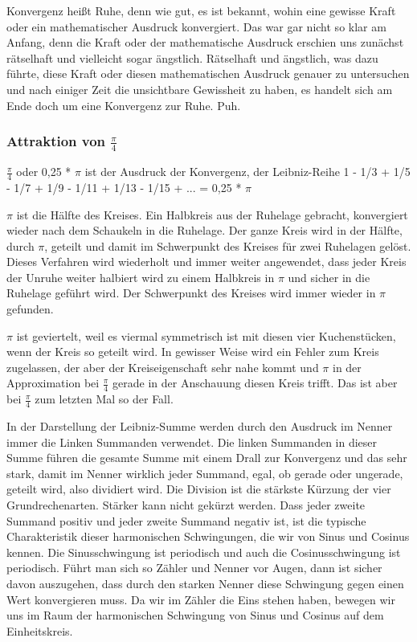 \documentclass[a4paper,12pt,twoside]{report}
\theoremstyle{definition}
\begin{document}
Konvergenz heißt Ruhe, denn wie gut, es ist bekannt, wohin eine gewisse Kraft oder ein mathematischer Ausdruck konvergiert. Das war gar nicht so klar am Anfang, denn die Kraft oder der mathematische Ausdruck erschien uns zunächst rätselhaft und vielleicht sogar ängstlich. Rätselhaft und ängstlich, was dazu führte, diese Kraft oder diesen mathematischen Ausdruck genauer zu untersuchen und nach einiger Zeit die unsichtbare Gewissheit zu haben, es handelt sich am Ende doch um eine Konvergenz zur Ruhe. Puh.

\subsubsection{Attraktion von $\frac{\pi}{4}$}

$\frac{\pi}{4}$ oder 0,25 * $\pi$ ist der Ausdruck der Konvergenz, der Leibniz-Reihe 1 - 1/3 + 1/5 - 1/7 + 1/9 - 1/11 + 1/13 - 1/15 + ... = 0,25 * $\pi$

$\pi$ ist die Hälfte des Kreises. Ein Halbkreis aus der Ruhelage gebracht, konvergiert wieder nach dem Schaukeln in die Ruhelage. Der ganze Kreis wird in der Hälfte, durch $\pi$, geteilt und damit im Schwerpunkt des Kreises für zwei Ruhelagen gelöst. Dieses Verfahren wird wiederholt und immer weiter angewendet, dass jeder Kreis der Unruhe weiter halbiert wird zu einem Halbkreis in $\pi$ und sicher in die Ruhelage geführt wird. Der Schwerpunkt des Kreises wird immer wieder in $\pi$ gefunden.

$\pi$ ist geviertelt, weil es viermal symmetrisch ist mit diesen vier Kuchenstücken, wenn der Kreis so geteilt wird. In gewisser Weise wird ein Fehler zum Kreis zugelassen, der aber der Kreiseigenschaft sehr nahe kommt und $\pi$ in der Approximation bei $\frac{\pi}{4}$ gerade in der Anschauung diesen Kreis trifft. Das ist aber bei $\frac{\pi}{4}$ zum letzten Mal so der Fall.

In der Darstellung der Leibniz-Summe werden durch den Ausdruck im Nenner immer die Linken Summanden verwendet. Die linken Summanden in dieser Summe führen die gesamte Summe mit einem Drall zur Konvergenz und das sehr stark, damit im Nenner wirklich jeder Summand, egal, ob gerade oder ungerade, geteilt wird, also dividiert wird. Die Division ist die stärkste Kürzung der vier Grundrechenarten. Stärker kann nicht gekürzt werden. Dass jeder zweite Summand positiv und jeder zweite Summand negativ ist, ist die typische Charakteristik dieser harmonischen Schwingungen, die wir von Sinus und Cosinus kennen. Die Sinusschwingung ist periodisch und auch die Cosinusschwingung ist periodisch. Führt man sich so Zähler und Nenner vor Augen, dann ist sicher davon auszugehen, dass durch den starken Nenner diese Schwingung gegen einen Wert konvergieren muss. Da wir im Zähler die Eins stehen haben, bewegen wir uns im Raum der harmonischen Schwingung von Sinus und Cosinus auf dem Einheitskreis. 
\end{document}
